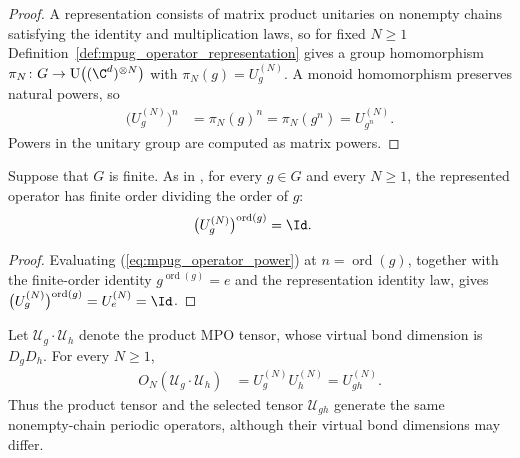 \begin{proof}\leanok
    A representation consists of matrix product unitaries on nonempty chains
    satisfying the identity and multiplication laws, so for fixed $N\geq1$
    Definition~\ref{def:mpug_operator_representation} gives a group
    homomorphism $\pi_N\colon G\to\mathrm U\bigl((\C^d)^{\otimes N}\bigr)$ with
    $\pi_N(g)=U_g^{(N)}$. A monoid homomorphism preserves natural powers, so
    \begin{align}
        \bigl(U_g^{(N)}\bigr)^n & =\pi_N(g)^n=\pi_N(g^n)=U_{g^n}^{(N)}.
    \end{align}
    Powers in the unitary group are computed as matrix powers.
\end{proof}

\begin{lemma}
    \label{thm:mpug_operator_finite_order}
    \leanok
    Suppose that $G$ is finite. As in
    \cite[line~1547]{FrancoRubio2025MPUGauging}, for every $g\in G$ and every
    $N\geq1$, the represented operator has finite order dividing the order of
    $g$:
    \begin{align}
        \bigl(U_g^{(N)}\bigr)^{\operatorname{ord}(g)} & =\Id.
    \end{align}
\end{lemma}

\begin{proof}\leanok
    Evaluating (\ref{eq:mpug_operator_power}) at $n=\operatorname{ord}(g)$,
    together with the finite-order identity $g^{\operatorname{ord}(g)}=e$ and
    the representation identity law, gives
    $\bigl(U_g^{(N)}\bigr)^{\operatorname{ord}(g)}=U_e^{(N)}=\Id$.
\end{proof}


\begin{lemma}
    \label{thm:mpug_product_tensor_operator}
    \leanok
    Let $\mathcal U_g\mathbin{\cdot}\mathcal U_h$ denote the product MPO tensor,
    whose virtual bond dimension is $D_gD_h$. For every $N\geq1$,
    \begin{align}
        O_N(\mathcal U_g\mathbin{\cdot}\mathcal U_h)
         & =U_g^{(N)}U_h^{(N)}
        =U_{gh}^{(N)}.
        \label{eq:mpug_product_tensor_positive_chain}
    \end{align}
    Thus the product tensor and the selected tensor $\mathcal U_{gh}$ generate
    the same nonempty-chain periodic operators, although their virtual bond
    dimensions may differ.
\end{lemma}

